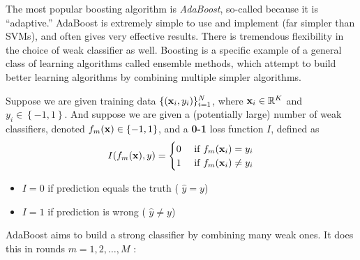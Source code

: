 The most popular boosting algorithm is \textit{AdaBoost}, so-called because it is ``adaptive.'' AdaBoost is extremely simple to use and implement (far simpler than SVMs), and often gives very effective results. There is tremendous flexibility in the choice of weak classifier as well. Boosting is a specific example of a general class of learning algorithms called ensemble methods, which attempt to build better learning algorithms by combining multiple simpler algorithms.

Suppose we are given training data $\{({\mathbf{x}}_i, y_i)\}^N_{i=1}$, where ${\mathbf{x}}_i \in \mathbb{R}^K$ and $y_i \in \left\{-1, 1\right\}$. And suppose we are given a (potentially large) number of weak classifiers, denoted $f_m({\mathbf{x}}) \in \left\{-1, 1\right\}$, and a \textbf{0-1} loss function $I$, defined as
\begin{align*}
	I(f_m({\mathbf{x}}), y) = \begin{cases}
		0&\text{ if } f_m({\mathbf{x}}_i)=y_i\\
		1&\text{ if } f_m({\mathbf{x}}_i)\neq y_i
	\end{cases}
\end{align*}
\begin{itemize}
	\item $I=0$ if prediction equals the truth ( $\hat{y}=y$)
	\item $I=1$ if prediction is wrong ( $\hat{y}\neq y$)
\end{itemize}

AdaBoost aims to build a strong classifier by combining many weak ones. It does this in rounds $m=1,2,\dots,M$ :

